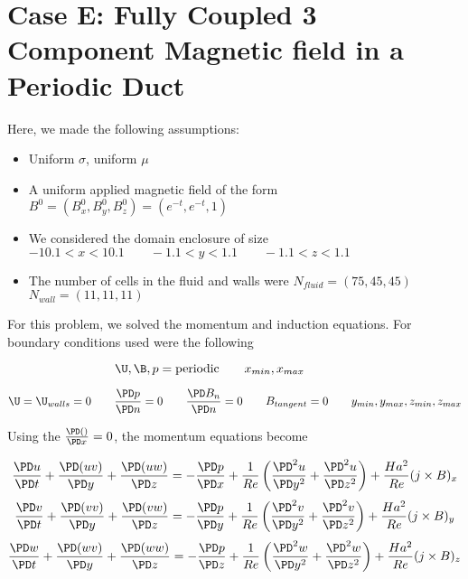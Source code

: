 \documentclass[11pt]{article}
\begin{document}
\doublespacing
\MOONSTITLE
\maketitle

\section{Case E: Fully Coupled 3 Component Magnetic field in a Periodic Duct}

Here, we made the following assumptions:

\begin{itemize}
\item Uniform $\sigma$, uniform $\mu$
\item A uniform applied magnetic field of the form $B^0 = (B_x^0,B_y^0,B_z^0) = (e^{-t},e^{-t},1)$
\item We considered the domain enclosure of size $-10.1 < x < 10.1 \qquad -1.1 < y < 1.1 \qquad -1.1 < z < 1.1$
\item The number of cells in the fluid and walls were $N_{fluid} = (75,45,45)$ \qquad $N_{wall} = (11,11,11)$
\end{itemize}


For this problem, we solved the momentum and induction equations. For boundary conditions used were the following

\begin{equation}
	\U,
	\B,
	p = \text{periodic}
	\qquad
	x_{min},x_{max}
	\qquad \qquad
\end{equation}

\begin{equation}
	\U = \U_{walls} = 0
	\qquad
	\frac{\PD p}{\PD n} = 0
	\qquad
	\frac{\PD B_{n}}{\PD n} = 0
	\qquad
	B_{tangent} = 0
	\qquad
	y_{min},y_{max},
	z_{min},z_{max}
\end{equation}

Using the $\frac{\PD ()}{\PD x} = 0$, the momentum equations become

\begin{equation}
	\frac{\PD u}{\PD t}
	+ \frac{\PD (u v)}{\PD y}
	+ \frac{\PD (u w)}{\PD z}
	=
	- \frac{\PD p}{\PD x}
	+ \frac{1}{Re}
	\left(
	\frac{\PD^2 u}{\PD y^2}
	+\frac{\PD^2 u}{\PD z^2}
	\right)
	+ \frac{Ha^2}{Re}
	(j \times B)_x
\end{equation}
\begin{equation}
	\frac{\PD v}{\PD t}
	+ \frac{\PD (v v)}{\PD y}
	+ \frac{\PD (v w)}{\PD z}
	=
	- \frac{\PD p}{\PD y}
	+ \frac{1}{Re}
	\left(
	\frac{\PD^2 v}{\PD y^2}
	+\frac{\PD^2 v}{\PD z^2}
	\right)
	+ \frac{Ha^2}{Re}
	(j \times B)_y
\end{equation}
\begin{equation}
	\frac{\PD w}{\PD t}
	+ \frac{\PD (w v)}{\PD y}
	+ \frac{\PD (w w)}{\PD z}
	=
	- \frac{\PD p}{\PD z}
	+ \frac{1}{Re}
	\left(
	\frac{\PD^2 w}{\PD y^2}
	+\frac{\PD^2 w}{\PD z^2}
	\right)
	+ \frac{Ha^2}{Re}
	(j \times B)_z
\end{equation}
\end{document}
